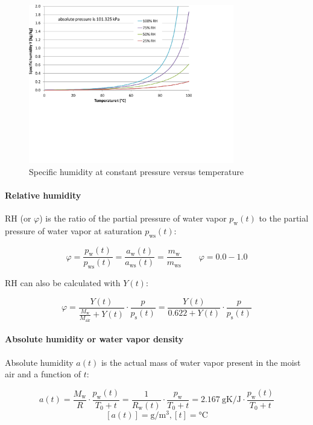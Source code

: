 \documentclass[11pt,a4paper,english,twoside]{scrreprt}
\begin{document}
\begin{figure}
  \centering
  \includegraphics*[width=0.8\textwidth,angle=0]{FCF_Diag_Y2.pdf}
  \caption[Specific humidity at constant pressure versus temperature]{Specific humidity at constant pressure versus temperature} 
\end{figure}


\paragraph{Relative humidity}

RH (or $\varphi$) is the ratio of the partial pressure of water vapor $p_\text{w}(t)$ to the partial pressure of water vapor at saturation $p_\text{ws}(t)$:

\[\varphi =\frac{p_\text{w}(t)}{p_\text{ws}(t)} =\frac{a_\text{w}(t)}{a_\text{ws}(t)} =\frac{m_\text{w}}{m_\text{ws}} \qquad \varphi = 0.0-1.0\]


RH can also be calculated with $Y(t)$:

\begin{equation}
  \label{eqn:RH_Y}
  \varphi =\frac{Y(t)}{\frac{M_\text{w}}{M_\text{air}} + Y(t)} \cdot \frac{p}{p_\text{s} (t)} =\frac{Y(t)}{0.622+Y(t)} \cdot \frac{p}{p_\text{s}(t)} 
\end{equation}

\paragraph{Absolute humidity or water vapor density}

Absolute humidity $a(t)$ is the actual mass of water vapor present in the moist air and a function of $t$:

\[a(t)=\frac{M_\text{w}}{R} \cdot \frac{p_\text{w}(t)}{T_0 +t} =\frac{1}{R_\text{w}(t)} \cdot \frac{p_\text{w}}{T_0 +t} = \SI{2.167}{\gram\kelvin\per\joule} \cdot \frac{p_\text{w}(t)}{T_0 +t} \]
\[[a(t)] = \si{\gram\per\cubic\meter}, [t] = \si{\degreeCelsius} \]
\end{document}
